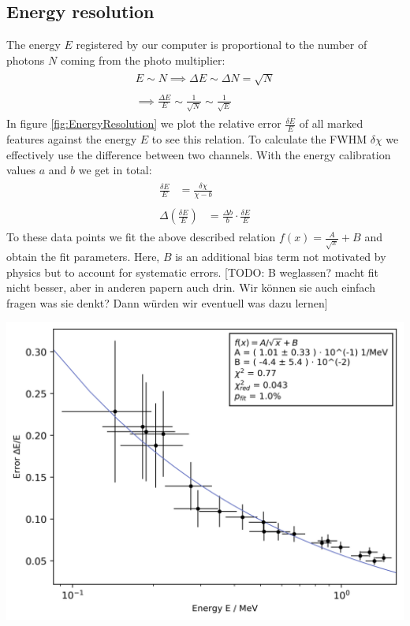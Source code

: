 \subsection{Energy resolution}
%
The energy $E$ registered by our computer is proportional to the number of photons $N$ coming from the photo multiplier:
\begin{align}
    \label{eq:}
    \begin{split}
        E \sim N \implies \Delta E \sim \Delta N = \sqrt{N}
    \end{split}
    \\
    \label{eq:}
    \begin{split}
        \implies \frac{\Delta E}{E} \sim \frac{1}{\sqrt{N}} \sim \frac{1}{\sqrt{E}}
    \end{split}
\end{align}
%
In figure \ref{fig:EnergyResolution} we plot the relative error $\frac{\delta E}{E}$ of all marked features against the energy $E$ to see this relation.
To calculate the FWHM $\delta \chi$ we effectively use the difference between two channels.
With the energy calibration values $a$ and $b$ we get in total:
\begin{align}
    \label{eq:}
    \begin{split}
        \frac{\delta E}{E} &= \frac{ \delta \chi }{\chi - b}
    \end{split}
    \\
    \label{eq:}
    \begin{split}
        \Delta \left ( \frac{\delta E}{E} \right ) &= \frac{ \Delta b }{ b } \cdot \frac{\delta E}{E}
    \end{split}
\end{align}
%
To these data points we fit the above described relation $f(x) = \frac{A}{\sqrt{x}} + B$ and obtain the fit parameters.
Here, $B$ is an additional bias term not motivated by physics but to account for systematic errors.
[TODO: B weglassen? macht fit nicht besser, aber in anderen papern auch drin. Wir können sie auch einfach fragen was sie denkt? Dann würden wir eventuell was dazu lernen]
%
\begin{multicolfloat}
    \includegraphics[width=\linewidth]{png/energy_resolution}
    \label{fig:EnergyResolution}
\end{multicolfloat}
%

